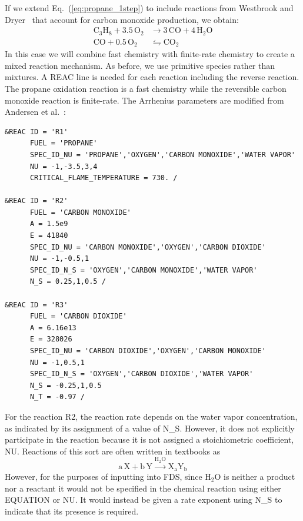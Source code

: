\documentclass[11pt]{book}
\begin{document}
If we extend Eq.~(\ref{eq:propane_1step}) to include reactions from Westbrook and Dryer~\cite{Westbrook:1} that account for carbon monoxide production, we obtain:
\begin{align}\label{eq:propane_2step}
\mathrm{C_3H_8+3.5 \, O_2}&\rightarrow  \mathrm{3\,CO+4 \, H_2O} \\
\nonumber \mathrm{CO + 0.5 \, O_2} &\leftrightharpoons \mathrm{CO_2}
\end{align}
In this case we will combine fast chemistry with finite-rate chemistry to create a mixed reaction mechanism. As before, we use primitive species rather than mixtures. A {\ct REAC} line is needed for each reaction including the reverse reaction. The propane oxidation reaction is a fast chemistry while the reversible carbon monoxide reaction is finite-rate. The Arrhenius parameters are modified from Andersen et al.~\cite{AndersenJ:1}:
\begin{lstlisting}
&REAC ID = 'R1'
      FUEL = 'PROPANE'
      SPEC_ID_NU = 'PROPANE','OXYGEN','CARBON MONOXIDE','WATER VAPOR'
      NU = -1,-3.5,3,4
      CRITICAL_FLAME_TEMPERATURE = 730. /

&REAC ID = 'R2'
      FUEL = 'CARBON MONOXIDE'
      A = 1.5e9
      E = 41840
      SPEC_ID_NU = 'CARBON MONOXIDE','OXYGEN','CARBON DIOXIDE'
      NU = -1,-0.5,1
      SPEC_ID_N_S = 'OXYGEN','CARBON MONOXIDE','WATER VAPOR'
      N_S = 0.25,1,0.5 /

&REAC ID = 'R3'
      FUEL = 'CARBON DIOXIDE'
      A = 6.16e13
      E = 328026
      SPEC_ID_NU = 'CARBON DIOXIDE','OXYGEN','CARBON MONOXIDE'
      NU = -1,0.5,1
      SPEC_ID_N_S = 'OXYGEN','CARBON DIOXIDE','WATER VAPOR'
      N_S = -0.25,1,0.5
      N_T = -0.97 /
\end{lstlisting}
For the reaction R2, the reaction rate depends on the water vapor concentration, as indicated by its assignment of a value of {\ct N\_S}. However, it does not explicitly participate in the reaction because it is not assigned a stoichiometric coefficient, {\ct NU}.  Reactions of this sort are often written in textbooks as
\begin{equation}\label{eq:inert_1step}
\mathrm{a \, X + b \, Y \overset{H_2O}{\longrightarrow} X_aY_b}
\end{equation}
However, for the purposes of inputting into FDS, since H$_2$O is neither a product nor a reactant it would not be specified in the chemical reaction using either {\ct EQUATION} or {\ct NU}.  It would instead be given a rate exponent using {\ct N\_S} to indicate that its presence is required.
\end{document}
